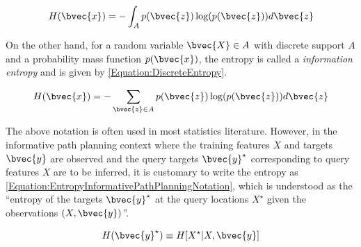 			\begin{equation}
				H(\bvec{x}) = - \int_{A} p(\bvec{z}) \log(p(\bvec{z})) d\bvec{z}
			\label{Equation:ContinuousEntropy}
			\end{equation}
										
			On the other hand, for a random variable $\bvec{X} \in A$ with discrete support $A$ and a probability mass function $p(\bvec{x})$, the entropy is called a \textit{information entropy} \cite{ShannonEntropy} and is given by \eqref{Equation:DiscreteEntropy}.
			
			\begin{equation}
				H(\bvec{x}) = - \sum_{\bvec{z} \in A} p(\bvec{z}) \log(p(\bvec{z})) d\bvec{z}
			\label{Equation:DiscreteEntropy}
			\end{equation}
			
			The above notation is often used in most statistics literature. However, in the informative path planning context where the training features $X$ and targets $\bvec{y}$ are observed and the query targets $\bvec{y}^{\star}$ corresponding to query features $X$ are to be inferred, it is customary to write the entropy as \eqref{Equation:EntropyInformativePathPlanningNotation}, which is understood as the ``entropy of the targets $\bvec{y}^{\star}$ at the query locations $X^{\star}$ given the observations $(X, \bvec{y})$''.
			
			\begin{equation}
				H(\bvec{y}^{\star}) \equiv H[X^{\star} | X, \bvec{y}]
			\label{Equation:EntropyInformativePathPlanningNotation}
			\end{equation}
			
%	
%		
		
%		
%		
		
